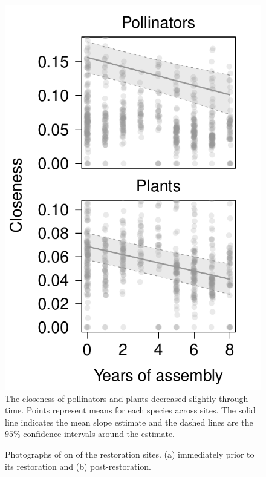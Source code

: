 \documentclass[12pt]{article}
\begin{document}
\begin{figure}
  \centering
  \includegraphics[width=.6\textwidth]{../analysis/speciesLevel/figures/closenessPanel.pdf}
  \caption{The closeness of pollinators and plants decreased slightly
    through time. Points represent means for each species across
    sites. The solid line indicates the mean slope estimate and the
    dashed lines are the $95\%$ confidence intervals around the
    estimate.}
  \label{fig:closeness}
\end{figure}
\clearpage

\begin{figure}[!tbp]
  \centering
  \hfill
  \caption{Photographs of on of the restoration sites. (a) immediately prior to its restoration and (b) post-restoration.}
\end{figure}
\clearpage
\end{document}
